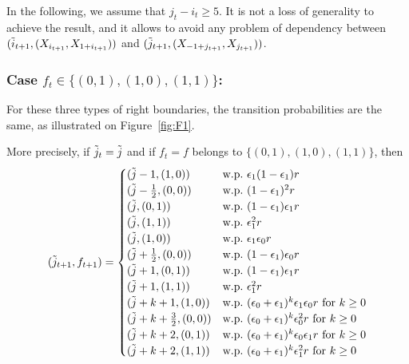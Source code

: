 \documentclass[11pt]{article}
\theoremstyle{plain}
\theoremstyle{definition}
\theoremstyle{remark}
\begin{document}
In the following, we assume that $j_t-i_t \geq 5$. It is not a loss of generality to achieve the result, and it allows to avoid any problem of dependency between $(\Tilde{i}_{t+1},(X_{i_{t+1}},X_{1+i_{t+1}}))$ and $(\Tilde{j}_{t+1},(X_{-1+j_{t+1}},X_{j_{t+1}}))$.

\subsubsection{Case $f_t \in \{(0,1),(1,0),(1,1)\}$:} For these three types of right boundaries, the transition probabilities are the same, as illustrated on Figure~\ref{fig:F1}. 
 
More precisely, if $\Tilde{j}_{t} = \Tilde{j}$ and if $f_t=f$ belongs to $\{(0,1),(1,0),(1,1)\}$, then
\begin{equation}
  (\Tilde{j}_{t+1},f_{t+1}) =
  \begin{cases}
    (\Tilde{j}-1,(1,0)) & \text{w.p.\ } \epsilon_1(1-\epsilon_1)r \\
    (\Tilde{j}-\frac{1}{2},(0,0)) & \text{w.p.\ } (1-\epsilon_1)^2r \\
    (\Tilde{j},(0,1)) & \text{w.p.\ } (1-\epsilon_1) \epsilon_1 r \\
    (\Tilde{j},(1,1)) & \text{w.p.\ } \epsilon_1^2r \\
    (\Tilde{j},(1,0)) & \text{w.p.\ } \epsilon_1 \epsilon_0 r \\
    (\Tilde{j}+\frac{1}{2},(0,0)) & \text{w.p.\ } (1-\epsilon_1) \epsilon_0 r \\
    (\Tilde{j}+1,(0,1)) & \text{w.p.\ } (1-\epsilon_1) \epsilon_1 r \\
    (\Tilde{j}+1,(1,1)) & \text{w.p.\ } \epsilon_1^2r \\
    (\Tilde{j}+k+1,(1,0)) & \text{w.p.\ } (\epsilon_0+\epsilon_1)^k \epsilon_1 \epsilon_0 r \text{ for } k \geq 0\\
    (\Tilde{j}+k+\frac{3}{2},(0,0)) & \text{w.p.\ } (\epsilon_0+\epsilon_1)^k \epsilon_0^2 r \text{ for } k \geq 0 \\
    (\Tilde{j}+k+2,(0,1)) & \text{w.p.\ } (\epsilon_0+\epsilon_1)^k \epsilon_0 \epsilon_1 r \text{ for } k \geq 0 \\
    (\Tilde{j}+k+2,(1,1)) & \text{w.p.\ } (\epsilon_0+\epsilon_1)^k \epsilon_1^2 r \text{ for } k \geq 0
  \end{cases} \label{eq:trans1}
\end{equation}
\end{document}
